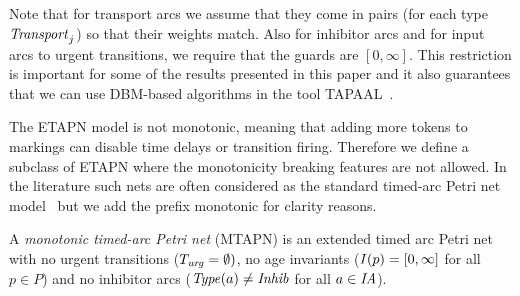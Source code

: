 Note that for transport arcs we assume that they come in pairs (for
each type $\mathit{Transport}_j$) so that their weights match.
Also for inhibitor arcs and for input arcs to urgent transitions, we
require that the guards are $[0,\infty]$. This restriction is important
for some of the results presented in this paper and it also guarantees that 
we can use DBM-based algorithms in the tool TAPAAL~\cite{DJJJMS:TACAS:12}.

The ETAPN model is not monotonic, meaning
that adding more tokens to markings can disable time delays or
transition firing.
Therefore we define a subclass of 
ETAPN where the monotonicity breaking features are not allowed.
In the literature such nets are often considered as the standard
timed-arc Petri net model~\cite{BLT:90,Hanisch:93} but we add the 
prefix monotonic for clarity reasons. 

\begin{definition} \label{deftapn}
A \emph{monotonic timed-arc Petri net} 
(MTAPN) is an extended timed arc Petri net 
with no urgent transitions ($T_{\mathit{urg}}=\emptyset)$, no age invariants
($\mathit{I}(p) = [0,\infty]$ for all $p \in P$) and no 
inhibitor arcs ($\mathit{Type}(a) \not= \mathit{Inhib}$ for all $a \in \mathit{IA}$).
\end{definition}



